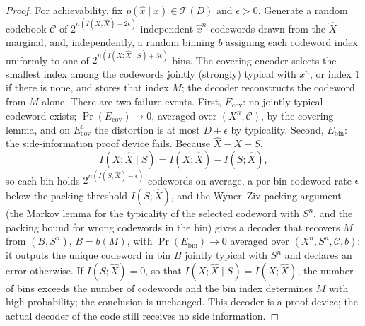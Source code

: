 \documentclass[11pt,onecolumn]{IEEEtran}
\newcommand{\hX}{\widehat{X}}
\begin{document}
\begin{proof}
For achievability, fix $p(\hat x\mid x)\in\mathcal T(D)$ and $\epsilon>0$.
Generate a random codebook $\mathcal C$ of $2^{n(I(X;\hX)+2\epsilon)}$
independent $\hat x^n$ codewords drawn from the $\hX$-marginal, and,
independently, a random binning $b$ assigning each codeword index
uniformly to one of $2^{n(I(X;\hX\mid S)+3\epsilon)}$ bins. The covering
encoder selects the smallest index among the codewords jointly
(strongly) typical with $x^n$, or index $1$ if there is none, and stores
that index $M$; the decoder
reconstructs the codeword from $M$ alone. There are two failure events. First,
$E_{\mathrm{cov}}$: no jointly typical codeword exists;
$\Pr(E_{\mathrm{cov}})\to0$, averaged over $(X^n,\mathcal C)$, by the
covering lemma, and on $E_{\mathrm{cov}}^{\mathrm c}$ the distortion is
at most $D+\epsilon$ by typicality. Second, $E_{\mathrm{bin}}$: the
side-information proof device fails. Because $\hX-X-S$,
\begin{equation}
 I(X;\hX\mid S)=I(X;\hX)-I(S;\hX),
\end{equation}
so each bin holds $2^{n(I(S;\hX)-\epsilon)}$ codewords on average, a
per-bin codeword rate $\epsilon$ below the packing threshold $I(S;\hX)$,
and the Wyner--Ziv packing argument \cite{wynerziv1976} (the Markov lemma for
the typicality of the selected codeword with $S^n$, and the packing
bound for wrong codewords in the bin) gives a decoder that recovers $M$
from $(B,S^n)$, $B=b(M)$, with
$\Pr(E_{\mathrm{bin}})\to0$ averaged over $(X^n,S^n,\mathcal C,b)$: it
outputs the unique codeword in bin $B$ jointly typical with $S^n$ and
declares an error otherwise. If $I(S;\hX)=0$, so that
$I(X;\hX\mid S)=I(X;\hX)$, the number of bins exceeds the number of
codewords and the bin index determines $M$ with high probability; the
conclusion is unchanged. This decoder is a proof device; the actual
decoder of the code still receives no side information.


\end{proof}
\end{document}
